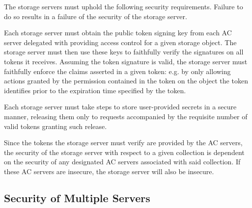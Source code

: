 The storage servers must uphold the following security
requirements. Failure to do so results in a failure of the security of
the storage server.

\begin{packed_desc}
\item[Token Verification:] Each storage server must obtain the public
  token signing key from each AC server delegated with providing
  access control for a given storage object. The storage server must
  then use these keys to faithfully verify the signatures on all
  tokens it receives. Assuming the token signature is valid, the
  storage server must faithfully enforce the claims asserted in a
  given token: e.g. by only allowing actions granted by the permission
  contained in the token on the object the token identifies prior to
  the expiration time specified by the token.
\item[Secure Storage:] Each storage server must take steps to store
  user-provided secrets in a secure manner, releasing them only to
  requests accompanied by the requisite number of valid tokens
  granting such release.
\end{packed_desc}

Since the tokens the storage server must verify are provided by the AC
servers, the security of the storage server with respect to a given
collection is dependent on the security of any designated AC servers
associated with said collection. If these AC servers are insecure, the
storage server will also be insecure.



\subsection{Security of Multiple Servers}

